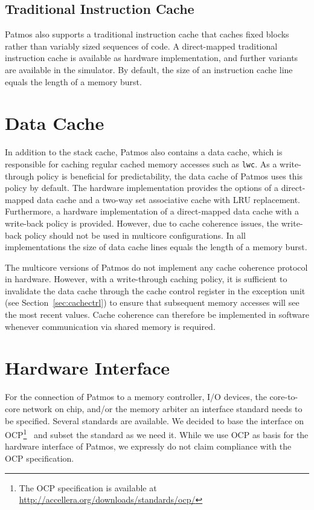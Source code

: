\documentclass[a4paper,fontsize=10pt,twoside,DIV15,BCOR12mm,headinclude=true,footinclude=false,pagesize,bibtotoc]{scrbook}
\newcommand{\code}[1]{{\texttt{#1}}}
\begin{document}
\subsection{Traditional Instruction Cache}
\label{sec:line-cache}

Patmos also supports a traditional instruction cache that caches fixed
blocks rather than variably sized sequences of code. A direct-mapped
traditional instruction cache is available as hardware implementation,
and further variants are available in the simulator. By default, the
size of an instruction cache line equals the length of a memory burst.

\section{Data Cache}

In addition to the stack cache, Patmos also contains a data cache,
which is responsible for caching regular cached memory accesses such
as \code{lwc}. As a write-through policy is beneficial for
predictability, the data cache of Patmos uses this policy by
default. The hardware implementation provides the options of a
direct-mapped data cache and a two-way set associative cache with LRU
replacement. Furthermore, a hardware implementation of a direct-mapped
data cache with a write-back policy is provided. However, due to cache
coherence issues, the write-back policy should not be used in
multicore configurations. In all implementations the size of
data cache lines equals the length of a memory burst.

The multicore versions of Patmos do not implement any cache coherence
protocol in hardware. However, with a write-through caching policy, it
is sufficient to invalidate the data cache through the cache control
register in the exception unit (see Section~\ref{sec:cachectrl}) to
ensure that subsequent memory accesses will see the most recent
values. Cache coherence can therefore be implemented in software
whenever communication via shared memory is required.

\section{Hardware Interface}

For the connection of Patmos to a memory controller, I/O devices, the
core-to-core network on chip, and/or the memory arbiter an interface
standard needs to be specified. Several standards are available.  We
decided to base the interface on OCP\footnote{The OCP specification is
  available at \url{http://accellera.org/downloads/standards/ocp/}}~\cite{ocp:spec}
and subset the standard as we need it. While we use OCP as basis for
the hardware interface of Patmos, we expressly do not claim
compliance with the OCP specification.
\end{document}
